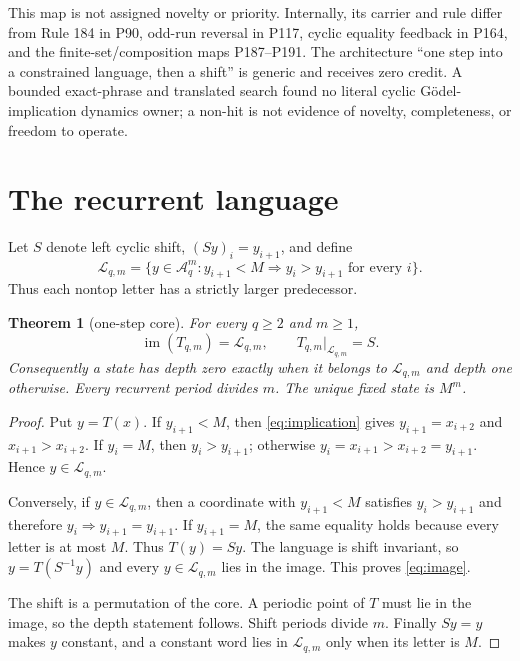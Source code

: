 \documentclass[a4paper,10pt]{amsart}
\newtheorem{theorem}{Theorem}[section]
\theoremstyle{remark}
\newcommand{\A}{\mathcal A}
\newcommand{\Lcal}{\mathcal L}
\newcommand{\im}{\operatorname{im}}
\begin{document}
This map is not assigned novelty or priority.  Internally, its carrier and
rule differ from Rule 184 in P90, odd-run reversal in P117, cyclic equality
feedback in P164, and the finite-set/composition maps P187--P191.  The
architecture ``one step into a constrained language, then a shift'' is
generic and receives zero credit.  A bounded exact-phrase and translated
search found no literal cyclic G\"odel-implication dynamics owner; a non-hit
is not evidence of novelty, completeness, or freedom to operate.

\section{The recurrent language}

Let $S$ denote left cyclic shift, $(Sy)_i=y_{i+1}$, and define
\begin{equation}\label{eq:language}
 \Lcal_{q,m}=\{y\in\A_q^m:y_{i+1}<M\Longrightarrow y_i>y_{i+1}
 \text{ for every }i\}.
\end{equation}
Thus each nontop letter has a strictly larger predecessor.

\begin{theorem}[one-step core]\label{thm:core}
For every $q\ge2$ and $m\ge1$,
\begin{equation}\label{eq:image}
 \im(T_{q,m})=\Lcal_{q,m},\qquad T_{q,m}|_{\Lcal_{q,m}}=S.
\end{equation}
Consequently a state has depth zero exactly when it belongs to
$\Lcal_{q,m}$ and depth one otherwise.  Every recurrent period divides $m$.
The unique fixed state is $M^m$.
\end{theorem}

\begin{proof}
Put $y=T(x)$.  If $y_{i+1}<M$, then \eqref{eq:implication} gives
$y_{i+1}=x_{i+2}$ and $x_{i+1}>x_{i+2}$.  If $y_i=M$, then
$y_i>y_{i+1}$; otherwise $y_i=x_{i+1}>x_{i+2}=y_{i+1}$.  Hence
$y\in\Lcal_{q,m}$.

Conversely, if $y\in\Lcal_{q,m}$, then a coordinate with
$y_{i+1}<M$ satisfies $y_i>y_{i+1}$ and therefore
$y_i\Rightarrow y_{i+1}=y_{i+1}$.  If $y_{i+1}=M$, the same equality holds
because every letter is at most $M$.  Thus $T(y)=Sy$.  The language is
shift invariant, so $y=T(S^{-1}y)$ and every $y\in\Lcal_{q,m}$ lies in the
image.  This proves \eqref{eq:image}.

The shift is a permutation of the core.  A periodic point of $T$ must lie in
the image, so the depth statement follows.  Shift periods divide $m$.
Finally $Sy=y$ makes $y$ constant, and a constant word lies in
$\Lcal_{q,m}$ only when its letter is $M$.
\end{proof}
\end{document}
